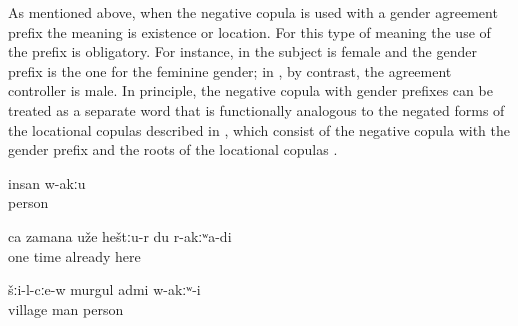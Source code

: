 As mentioned above, when the negative copula is used with a gender agreement prefix the meaning is existence or location. For this type of meaning the use of the prefix is obligatory. For instance, in  the subject is female and the gender prefix is the one for the feminine gender; in , by contrast, the agreement controller is male. In principle, the negative copula with gender prefixes can be treated as a separate word that is functionally analogous to the negated forms of the locational copulas described in , which consist of the negative copula with the gender prefix and the roots of the locational copulas .
%
\begin{exe}
	\ex	\label{ex:Nobody is there}
	\gll	insan	w-akːu\\
		person	\\
	\glt	{}

	\ex	\label{ex:At one time I was already not there anymore}
	\gll	ca	zamana	uže	heštːu-r	du	r-akːʷa-di\\
		one	time	already	here		\\
	\glt	{}

	\ex	\label{ex:In the village there was no man}
	\gll	šːi-l-cːe-w	murgul	admi	w-akːʷ-i\\
		village	man	person	\\
	\glt	{}
\end{exe}

